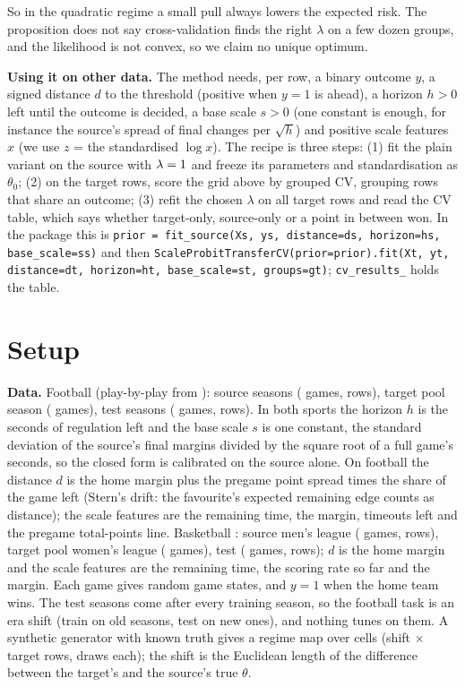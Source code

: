 \documentclass{article}
\begin{document}
So in the quadratic regime a small pull always lowers the expected risk.
The proposition does not say cross-validation finds the right $\lambda$ on a few dozen groups, and the likelihood is not convex, so we claim no unique optimum.

\textbf{Using it on other data.}
The method needs, per row, a binary outcome $y$, a signed distance $d$ to the threshold (positive when $y = 1$ is ahead), a horizon $h > 0$ left until the outcome is decided, a base scale $s > 0$ (one constant is enough, for instance the source's spread of final changes per $\sqrt{h}$) and positive scale features $x$ (we use $z$ = the standardised $\log x$).
The recipe is three steps: (1) fit the plain variant on the source with $\lambda = 1$ and freeze its parameters and standardisation as $\theta_0$; (2) on the target rows, score the grid above by grouped CV, grouping rows that share an outcome; (3) refit the chosen $\lambda$ on all target rows and read the CV table, which says whether target-only, source-only or a point in between won.
In the package this is \texttt{prior = fit\_source(Xs, ys, distance=ds, horizon=hs, base\_scale=ss)} and then \texttt{ScaleProbitTransferCV(prior=prior).fit(Xt, yt, distance=dt, horizon=ht, base\_scale=st, groups=gt)}; \texttt{cv\_results\_} holds the table.

\section{Setup}
\label{sec:setup}

\textbf{Data.}
Football (play-by-play from \citealp{nflverse}): source seasons \nFbSrcYears{} (\nFbSrcGames{} games, \nFbSrcRows{} rows), target pool season \nFbPoolYears{} (\nFbFullGames{} games), test seasons \nFbTestYears{} (\nFbTestGames{} games, \nFbTestRows{} rows).
In both sports the horizon $h$ is the seconds of regulation left and the base scale $s$ is one constant, the standard deviation of the source's final margins divided by the square root of a full game's seconds, so the closed form is calibrated on the source alone.
On football the distance $d$ is the home margin plus the pregame point spread times the share of the game left (Stern's drift: the favourite's expected remaining edge counts as distance); the \nFbNFeat{} scale features are the remaining time, the margin, timeouts left and the pregame total-points line.
Basketball \citep{sportsdataverse}: source men's league \nHpSrcYears{} (\nHpSrcGames{} games, \nHpSrcRows{} rows), target pool women's league \nHpPoolYears{} (\nHpFullGames{} games), test \nHpTestYears{} (\nHpTestGames{} games, \nHpTestRows{} rows); $d$ is the home margin and the \nHpNFeat{} scale features are the remaining time, the scoring rate so far and the margin.
Each game gives \nFbRowsPerGame{} random game states, and $y = 1$ when the home team wins.
The test seasons come after every training season, so the football task is an era shift (train on old seasons, test on new ones), and nothing tunes on them.
A synthetic generator with known truth gives a regime map over \nSynCells{} cells (shift $\times$ target rows, \nSynSeeds{} draws each); the shift is the Euclidean length of the difference between the target's and the source's true $\theta$.
\end{document}
